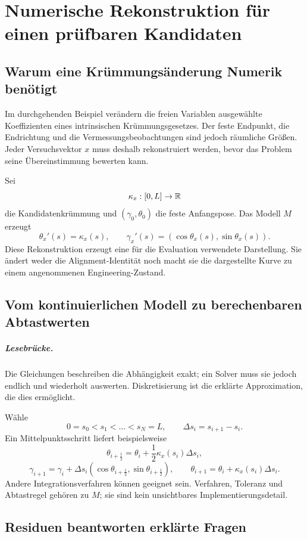 \chapter{Numerische Rekonstruktion für einen prüfbaren Kandidaten}

\section{Warum eine Krümmungsänderung Numerik benötigt}

Im durchgehenden Beispiel verändern die freien Variablen ausgewählte
Koeffizienten eines intrinsischen Krümmungsgesetzes. Der feste Endpunkt, die
Endrichtung und die Vermessungsbeobachtungen sind jedoch räumliche Größen.
Jeder Versuchsvektor \(x\) muss deshalb rekonstruiert werden, bevor das Problem
seine Übereinstimmung bewerten kann.

Sei
\[
\kappa_x:[0,L]\rightarrow\mathbb{R}
\]
die Kandidatenkrümmung und \((\gamma_0,\theta_0)\) die feste Anfangspose. Das
Modell \(M\) erzeugt
\[
\theta_x'(s)=\kappa_x(s),\qquad
\gamma_x'(s)=(\cos\theta_x(s),\sin\theta_x(s)).
\]
Diese Rekonstruktion erzeugt eine für die Evaluation verwendete Darstellung.
Sie ändert weder die Alignment-Identität noch macht sie die dargestellte Kurve
zu einem angenommenen Engineering-Zustand.

\section{Vom kontinuierlichen Modell zu berechenbaren Abtastwerten}

\paragraph{Lesebrücke.}
Die Gleichungen beschreiben die Abhängigkeit exakt; ein Solver muss sie jedoch
endlich und wiederholt auswerten. Diskretisierung ist die erklärte
Approximation, die dies ermöglicht.

Wähle
\[
0=s_0<s_1<\dots<s_N=L,\qquad \Delta s_i=s_{i+1}-s_i .
\]
Ein Mittelpunktsschritt liefert beispielsweise
\[
\theta_{i+\frac12}=\theta_i+
 \frac12\kappa_x(s_i)\Delta s_i,
\]
\[
\gamma_{i+1}=\gamma_i+\Delta s_i
(\cos\theta_{i+\frac12},\sin\theta_{i+\frac12}),\qquad
\theta_{i+1}=\theta_i+\kappa_x(s_i)\Delta s_i.
\]
Andere Integrationsverfahren können geeignet sein. Verfahren, Toleranz und
Abtastregel gehören zu \(M\); sie sind kein unsichtbares
Implementierungsdetail.

\section{Residuen beantworten erklärte Fragen}


